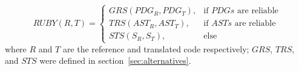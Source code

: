 $$
RUBY(R, T) = \begin{cases} 
				GRS(PDG_R, PDG_T), 	& \mbox{if } PDGs\mbox{ are reliable} \\ 
				TRS(AST_R, AST_T), 	& \mbox{if } ASTs\mbox{ are reliable} \\
				STS(S_R, S_T), 	& \mbox{else}
			\end{cases}
$$
where $R$ and $T$ are the reference and translated code respectively; 
$GRS$, $TRS$, and $STS$ were defined in section~\ref{sec:alternatives}.







